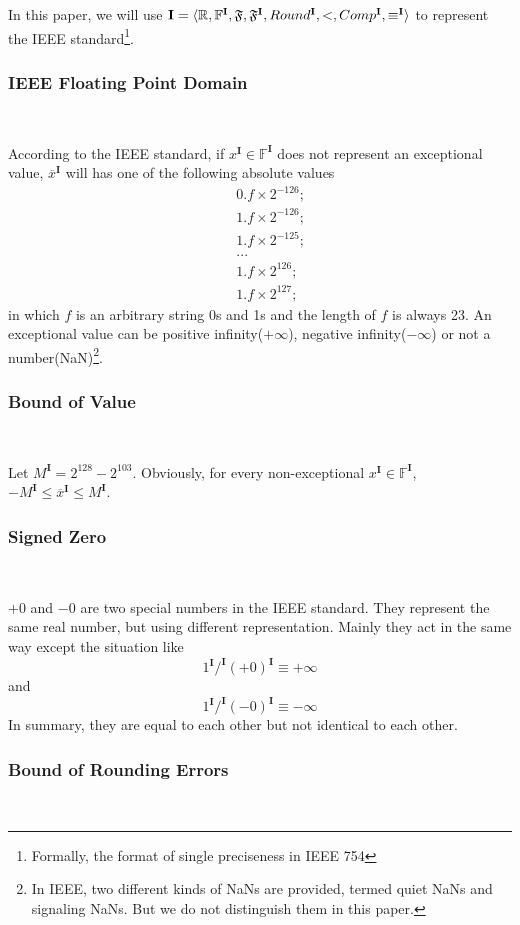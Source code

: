 \documentclass[12pt]{article}
\newcommand{\F}{\mathbb{F}}
\newcommand{\IEEE}{\mathbf{I}}
\newcommand{\OL}{\overline}
\begin{document}
In this paper, we will use $\IEEE = \langle \R, \F^\IEEE, \mathfrak{F}, \mathfrak{F}^\IEEE, Round^\IEEE, <, Comp^\IEEE, \equiv^\IEEE \rangle$ to represent the IEEE standard\footnote{Formally, the format of single preciseness in IEEE 754}.

\subsubsection{IEEE Floating Point Domain} \

According to the IEEE standard, if $x^\IEEE \in \F^\IEEE$ does not represent an exceptional value, $\OL x^\IEEE$ will has one of the following absolute values
\begin{eqnarray*}
&& 0.f \times 2^{-126}; \\
&& 1.f \times 2^{-126}; \\
&& 1.f \times 2^{-125}; \\
&& ... \\
&& 1.f \times 2^{126}; \\
&& 1.f \times 2^{127};
\end{eqnarray*}
in which $f$ is an arbitrary string 0s and 1s and the length of $f$ is always 23. An exceptional value can be positive infinity($+\infty$), negative infinity($- \infty$) or not a number(NaN)\footnote{In IEEE, two different kinds of NaNs are provided, termed quiet NaNs and signaling NaNs. But we do not distinguish them in this paper.}.

\subsubsection{Bound of Value} \

Let $M^\IEEE = 2^{128} - 2^{103}$. Obviously, for every non-exceptional $x^\IEEE \in \F^\IEEE$, $-M^\IEEE \leq \OL x^\IEEE \leq M^\IEEE$.

\subsubsection{Signed Zero} \

$+0$ and $-0$ are two special numbers in the IEEE standard. They represent the same real number, but using different representation. Mainly they act in the same way except the situation like $$1^\IEEE /^\IEEE (+0)^\IEEE \equiv +\infty$$ and $$1^\IEEE /^\IEEE (-0)^\IEEE \equiv -\infty$$ In summary, they are equal to each other but not identical to each other.

\subsubsection{Bound of Rounding Errors} \
\end{document}
